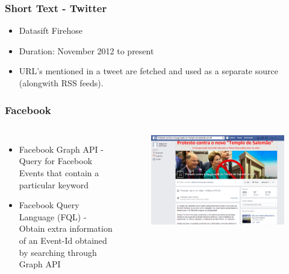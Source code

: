 \documentclass[red]{beamer}
\begin{document}
\begin{frame}
    \frametitle{Short Text - Twitter}
        \begin{itemize}
            \item
                Datasift Firehose
            \item
                Duration: November 2012 to present
            \item
                URL's mentioned in a tweet are fetched and used as a separate source (alongwith RSS feeds).
        \end{itemize}
\end{frame}

\begin{frame}
    \frametitle{Facebook}
    \begin{columns}
    \begin{itemize}
        \item
            Facebook Graph API - Query for Facebook Events that contain a particular keyword
        \item
            Facebook Query Language (FQL) - Obtain extra information of an Event-Id obtained by searching through Graph API
    \end{itemize}
    \begin{figure}
        \includegraphics[scale=0.22]{FB_Event_example}
    \end{figure}
    \end{columns}
\end{frame}
\end{document}
